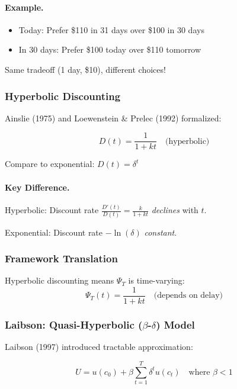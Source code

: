 \paragraph{Example.}
\begin{itemize}
    \item Today: Prefer \$110 in 31 days over \$100 in 30 days
    \item In 30 days: Prefer \$100 today over \$110 tomorrow
\end{itemize}

Same tradeoff (1 day, \$10), different choices!

\subsubsection{Hyperbolic Discounting}

Ainslie (1975) and Loewenstein \& Prelec (1992) formalized:

\begin{equation}
\boxed{
D(t) = \frac{1}{1 + kt} \quad \text{(hyperbolic)}
}
\label{eq:hyperbolic}
\end{equation}

Compare to exponential: $D(t) = \delta^t$

\paragraph{Key Difference.}
Hyperbolic: Discount rate $\frac{D'(t)}{D(t)} = \frac{k}{1+kt}$ \textit{declines} with $t$.

Exponential: Discount rate $-\ln(\delta)$ \textit{constant}.

\subsubsection{Framework Translation}

Hyperbolic discounting means $\Psi_T$ is time-varying:
\begin{equation}
\Psi_T(t) = \frac{1}{1+kt} \quad \text{(depends on delay)}
\end{equation}

\subsubsection{Laibson: Quasi-Hyperbolic ($\beta$-$\delta$) Model}

Laibson (1997) introduced tractable approximation:

\begin{equation}
\boxed{
U = u(c_0) + \beta \sum_{t=1}^{T} \delta^t u(c_t) \quad \text{where } \beta < 1
}
\label{eq:beta-delta}
\end{equation}

